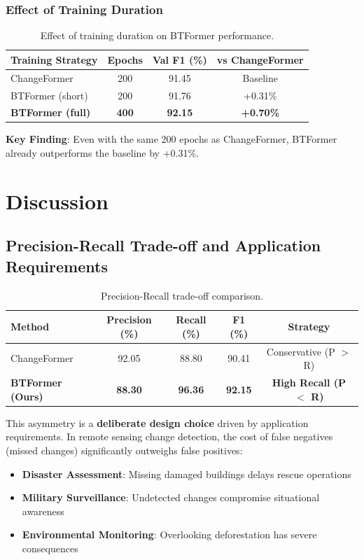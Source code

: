 \documentclass[journal]{IEEEtran}
\begin{document}
\subsubsection{Effect of Training Duration}

\begin{table}[H]
\centering
\caption{Effect of training duration on BTFormer performance.}
\begin{tabular}{lccc}
\toprule
\textbf{Training Strategy} & \textbf{Epochs} & \textbf{Val F1 (\%)} & \textbf{vs ChangeFormer} \\
\midrule
ChangeFormer & 200 & 91.45 & Baseline \\
BTFormer (short) & 200 & 91.76 & +0.31\% \\
\textbf{BTFormer (full)} & \textbf{400} & \textbf{92.15} & \textbf{+0.70\%} \\
\bottomrule
\end{tabular}
\end{table}

\textbf{Key Finding}: Even with the same 200 epochs as ChangeFormer, BTFormer already outperforms the baseline by +0.31\%.

\section{Discussion}

\subsection{Precision-Recall Trade-off and Application Requirements}

\begin{table}[H]
\centering
\caption{Precision-Recall trade-off comparison.}
\begin{tabular}{lcccc}
\toprule
\textbf{Method} & \textbf{Precision (\%)} & \textbf{Recall (\%)} & \textbf{F1 (\%)} & \textbf{Strategy} \\
\midrule
ChangeFormer & 92.05 & 88.80 & 90.41 & Conservative (P $>$ R) \\
\textbf{BTFormer (Ours)} & \textbf{88.30} & \textbf{96.36} & \textbf{92.15} & \textbf{High Recall (P $<$ R)} \\
\bottomrule
\end{tabular}
\end{table}

This asymmetry is a \textbf{deliberate design choice} driven by application requirements. In remote sensing change detection, the cost of false negatives (missed changes) significantly outweighs false positives:
\begin{itemize}
\item \textbf{Disaster Assessment}: Missing damaged buildings delays rescue operations
\item \textbf{Military Surveillance}: Undetected changes compromise situational awareness
\item \textbf{Environmental Monitoring}: Overlooking deforestation has severe consequences
\end{itemize}
\end{document}
